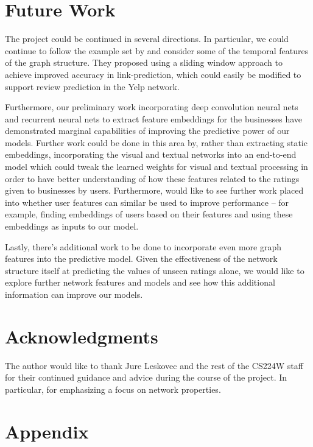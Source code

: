 \documentclass[letterpaper, 10 pt, conference]{ieeeconf}  %
\begin{document}
\section{Future Work}
The project could be continued in several directions. In particular, we could continue to follow the example set by \cite{PintrestProject} and consider some of the temporal features of the graph structure. They proposed using a sliding window approach to achieve improved accuracy in link-prediction, which could easily be modified to support review prediction in the Yelp network.

Furthermore, our preliminary work incorporating deep convolution neural nets and recurrent neural nets to extract feature embeddings for the businesses have demonstrated marginal capabilities of improving the predictive power of our models. Further work could be done in this area by, rather than extracting static embeddings, incorporating the visual and textual networks into an end-to-end model which could tweak the learned weights for visual and textual processing in order to have better understanding of how these features related to the ratings given to businesses by users. Furthermore, would like to see further work placed into whether user features can similar be used to improve performance -- for example, finding embeddings of users based on their features and using these embeddings as inputs to our model.

Lastly, there's additional work to be done to incorporate even more graph features into the predictive model. Given the effectiveness of the network structure itself at predicting the values of unseen ratings alone, we would like to explore further network features and models and see how this additional information can improve our models.


\section{Acknowledgments}
The author would like to thank Jure Leskovec and the rest of the CS224W staff for their continued guidance and advice during the course of the project. In particular, for emphasizing a focus on network properties.

{}


\section{Appendix}
\end{document}
